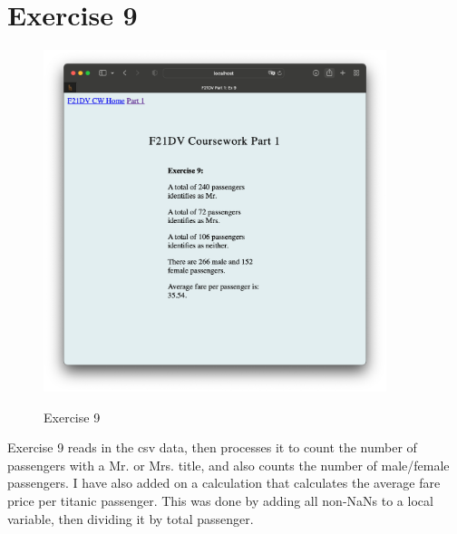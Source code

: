 \documentclass{scrreprt}
\begin{document}
\section{Exercise 9}
\begin{figure}[!ht]
    \centering
    \includegraphics[width = 10cm]{images/ex9.png}
    \label{fig:ex9}
    \caption{Exercise 9}
\end{figure}
\FloatBarrier

Exercise 9 reads in the csv data, then processes it to count the number of passengers with a Mr. or 
Mrs. title, and also counts the number of male/female passengers. I have also added on a calculation that
calculates the average fare price per titanic passenger. This was done by adding all non-NaNs to a local
variable, then dividing it by total passenger. 

\newpage
\end{document}
